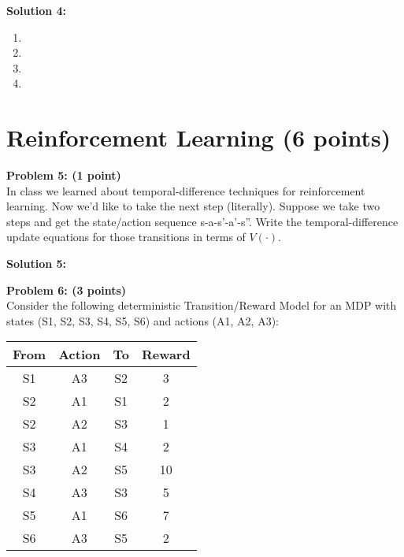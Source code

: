 \documentclass[]{article}
\begin{document}
\bigskip

\textbf{Solution 4:}
\begin{enumerate}[label=(\alph*)]
    \item %
    \item %
    \item %
    \item %
\end{enumerate}

\clearpage


\section{Reinforcement Learning (6 points)}

\textbf{Problem 5: (1 point)}\\
In class we learned about temporal-difference techniques for reinforcement learning. Now we'd like to take the next step (literally). Suppose we take two steps and get the state/action sequence s-a-s'-a'-s''. Write the temporal-difference update equations for those transitions in terms of $V(\cdot)$.

\bigskip

\textbf{Solution 5:}

\clearpage
\textbf{Problem 6: (3 points)}\\
Consider the following deterministic Transition/Reward Model for an MDP with states (S1, S2, S3, S4, S5, S6) and actions (A1, A2, A3):
\begin{table}[htb]
\centering
    \begin{tabular}{|c|c|c|c|}
      \hline
        From &	Action &	To &	Reward \\\hline
        S1 &	A3 &	S2 &	3 \\\hline
        S2 &	A1 &	S1 &	2 \\\hline
        S2 &	A2 &	S3 &	1 \\\hline
        S3 &	A1 &	S4 &	2 \\\hline
        S3 &	A2 &	S5 &	10 \\\hline
        S4 &	A3 &	S3 &	5 \\\hline
        S5 &	A1 & 	S6 &	7 \\\hline
        S6 &	A3 &	S5 &	2 \\\hline
    \end{tabular}
\end{table}
\end{document}
